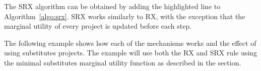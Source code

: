 \documentclass[runningheads]{llncs}
\newcommand{\kibitz}[2]{\ifnum\Comments=1{\color{#1}{#2}}\fi}
\newcommand{\rmr}[1]{\kibitz{red}{[Reshef says:#1]}}
\begin{document}
The SRX algorithm can be obtained by adding the highlighted line to Algorithm~\ref{algo:srx}. \rmr{Something is not clear in the algorithm. What is $S$? it it supposed to be all agents? this is $V$}  SRX works similarly to RX,  with the exception that the marginal utility of every project is updated before each step. 


The following example shows how each of the mechanisms works and the effect of using substitutes projects. The example will use both the  RX and SRX rule using the  minimal substitutes marginal utility function as described in the  section.
\end{document}
